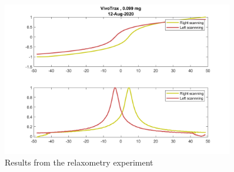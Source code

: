 \documentclass{article}
\begin{document}
\begin{itemize}
\begin{itemize}
\begin{figure}[h]
 \centering 
 \includegraphics[width=0.9\textwidth]{VivoTrax_12_Aug_2020_RelaxFig.png}
 \caption{Results from the relaxometry experiment}
 \end{figure}\end{itemize}


\end{itemize}
\end{document}
